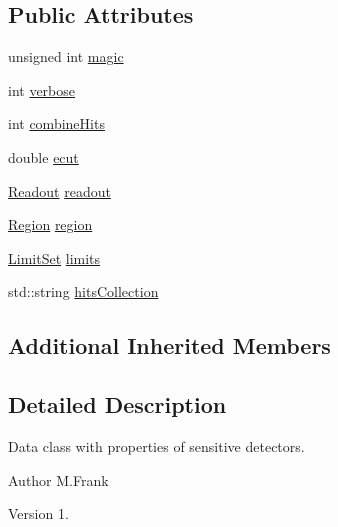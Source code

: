 \subsection*{Public Attributes}
\begin{DoxyCompactItemize}
\item 
unsigned int \hyperlink{class_d_d4hep_1_1_geometry_1_1_sensitive_detector_object_aa4d14ed3d51869d676732f3f19769baa}{magic}
\item 
int \hyperlink{class_d_d4hep_1_1_geometry_1_1_sensitive_detector_object_aeb8289c1e8386dcf52041d1bae827cfa}{verbose}
\item 
int \hyperlink{class_d_d4hep_1_1_geometry_1_1_sensitive_detector_object_aec18ccc329468200900de0fabf900e76}{combine\+Hits}
\item 
double \hyperlink{class_d_d4hep_1_1_geometry_1_1_sensitive_detector_object_a1c51c612aaac8b1ae21daf7030f0659a}{ecut}
\item 
\hyperlink{class_d_d4hep_1_1_geometry_1_1_readout}{Readout} \hyperlink{class_d_d4hep_1_1_geometry_1_1_sensitive_detector_object_a2bdcbb790c3ef059c619c250e082688d}{readout}
\item 
\hyperlink{class_d_d4hep_1_1_geometry_1_1_region}{Region} \hyperlink{class_d_d4hep_1_1_geometry_1_1_sensitive_detector_object_a022b7c934478f9778969ab16629d93c6}{region}
\item 
\hyperlink{class_d_d4hep_1_1_geometry_1_1_limit_set}{Limit\+Set} \hyperlink{class_d_d4hep_1_1_geometry_1_1_sensitive_detector_object_a46aaaef7d8eaba09dc9f7cc77c903d40}{limits}
\item 
std\+::string \hyperlink{class_d_d4hep_1_1_geometry_1_1_sensitive_detector_object_abf517c287f2744812828ba3e7c12a4f1}{hits\+Collection}
\end{DoxyCompactItemize}
\subsection*{Additional Inherited Members}


\subsection{Detailed Description}
Data class with properties of sensitive detectors. 

\begin{DoxyAuthor}{Author}
M.\+Frank 
\end{DoxyAuthor}
\begin{DoxyVersion}{Version}
1. 
\end{DoxyVersion}



